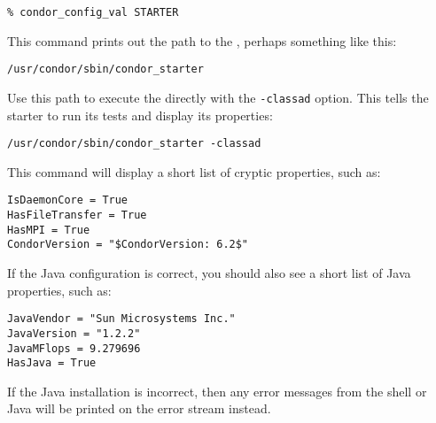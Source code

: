 \begin{verbatim}
% condor_config_val STARTER
\end{verbatim}

This command prints out the path to the ,
perhaps something like this:

\begin{verbatim}
/usr/condor/sbin/condor_starter
\end{verbatim}

Use this path to execute the  directly
with the \verb$-classad$ option.  This tells the starter
to run its tests and display its properties:

\begin{verbatim}
/usr/condor/sbin/condor_starter -classad
\end{verbatim}

This command will display a short list of cryptic properties, such as:

\begin{verbatim}
IsDaemonCore = True
HasFileTransfer = True
HasMPI = True
CondorVersion = "$CondorVersion: 6.2$"
\end{verbatim}

If the Java configuration is correct, you should also
see a short list of Java properties, such as:

\begin{verbatim}
JavaVendor = "Sun Microsystems Inc."
JavaVersion = "1.2.2"
JavaMFlops = 9.279696
HasJava = True
\end{verbatim}

If the Java installation is incorrect, then any error
messages from the shell or Java will be printed
on the error stream instead.

